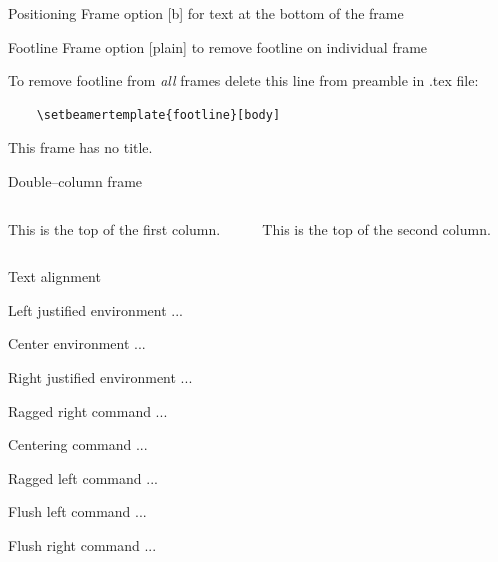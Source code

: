 \documentclass[11pt,t]{beamer}
\begin{document}
\begin{frame}[b]{Positioning}
Frame option [b] for text at the bottom of the frame
\vspace{8mm} %
\end{frame}




\begin{frame}{Footline}   %
\vspace{2.1mm} %
Frame option [plain] to remove footline on individual frame

\vspace{25pt}
To remove footline from \emph{all} frames delete this line from preamble in .tex file: 
	\begin{verbatim}
	\setbeamertemplate{footline}[body]
	\end{verbatim}
\end{frame}




\begin{frame}
	This frame has no title.
\end{frame}




\begin{frame}{Double--column frame}
	\begin{columns}[t]
		\begin{column}{.5\textwidth}
			This is the top of the first column.	
		\end{column}
		\begin{column}{.5\textwidth}
			This is the top of the second column.
		\end{column}
	\end{columns}	
\end{frame}




\begin{frame}{Text alignment}
	\begin{flushleft}
		Left justified 	environment ...
	\end{flushleft}
	\begin{center}
		Center environment ...
	\end{center}
	\begin{flushright}
		Right justified environment ...
	\end{flushright} 

\vspace{6pt}
\raggedright Ragged right command ...

\centering	Centering command ...

\raggedleft Ragged left command ...

\vspace{6pt}
\flushleft Flush left command ...

\flushright Flush right command ...
\end{frame}
\end{document}

